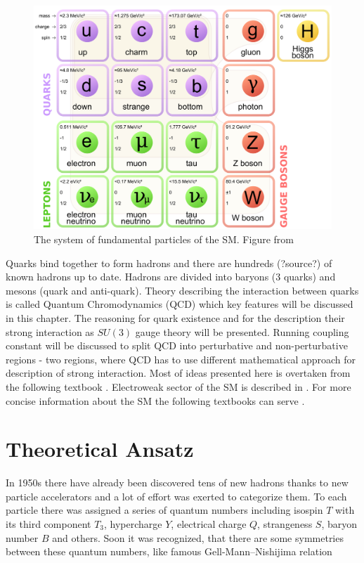 \documentclass[a4paper,11pt]{report}
\begin{document}
\begin{figure}[!ht]
  \centering
  \includegraphics[width=\textwidth]{Chapter1/SM.png} 
  \caption{The system of fundamental particles of the SM. Figure from
    \cite{wiki:SMParticlesSource}}
  \label{fig:SMparticles}
\end{figure}

Quarks bind together to form hadrons and there are hundreds (?source?) of known
hadrons up to date. Hadrons are divided into baryons (3 quarks) and mesons
(quark and anti-quark). Theory describing the interaction between quarks is called
Quantum Chromodynamics (QCD) which key features will be discussed in this
chapter. The reasoning for quark existence and for the description their strong
interaction as $SU(3)$ gauge theory will be presented. Running coupling constant
will be discussed to split QCD into perturbative and non-perturbative regions -
two regions, where QCD has to use different mathematical approach for description of
strong interaction. Most of ideas presented here is overtaken from the following
textbook \cite{QCDTextbook}. Electroweak sector of the SM is described in
\cite{horejsi2002fundamentals}. For more concise information about the SM the
following textbooks can serve
\cite{griffiths2008introduction,cottingham2007introduction}.

\section{Theoretical Ansatz}
\label{Sec:TheoreticalAnsatz}

In 1950s there have already been discovered tens of new hadrons thanks to new
particle accelerators and a lot of effort was exerted to categorize them. To each
particle there was assigned a series of quantum numbers
including isospin $T$ with its third component $T_3$, hypercharge $Y$,
electrical charge $Q$, strangeness $S$, baryon number $B$ and others. Soon it
was recognized, that there are some symmetries between these quantum numbers,
like famous Gell-Mann--Nishijima relation
\cite{GellMannNishijima1,GellMannNishijima2}
\end{document}
